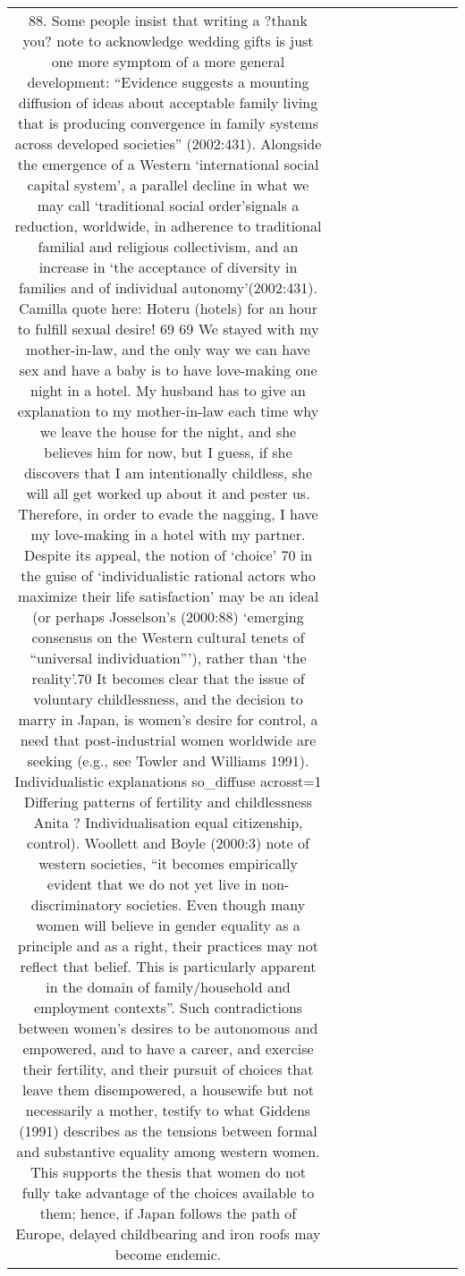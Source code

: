 \begin{table}[h!]
\begin{tabular}{|c|c|c|c|c|c|c|c|c|c|}
88. Some people insist that writing a ?thank you? note to acknowledge wedding gifts is just one more symptom of a more general development: “Evidence suggests a mounting diffusion of ideas about acceptable family living that is producing convergence in family systems across developed societies” (2002:431). Alongside the emergence of a Western ‘international social capital system’, a parallel decline in what we may call ‘traditional social order’signals a reduction, worldwide, in adherence to traditional familial and religious collectivism, and an increase in ‘the acceptance of diversity in families and of individual autonomy’(2002:431).
Camilla quote here:
Hoteru (hotels) for an hour to fulfill sexual desire! 69 69 We stayed with my mother-in-law, and the only way we can have sex and have a baby is to have love-making one night in a hotel. My husband has to give an explanation to my mother-in-law each time why we leave the house for the night, and she believes him for now, but I guess, if she discovers that I am intentionally childless, she will all get worked up about it and pester us.
Therefore, in order to evade the nagging, I have my love-making in a hotel with my partner.
Despite its appeal, the notion of ‘choice’ 70 in the guise of ‘individualistic rational actors who maximize their life satisfaction’ may be an ideal (or perhaps Josselson’s (2000:88) ‘emerging consensus on the Western cultural tenets of “universal individuation”’), rather than ‘the reality’.70 It becomes clear that the issue of voluntary childlessness, and the decision to marry in Japan, is women’s desire for control, a need that post-industrial women worldwide are seeking (e.g., see Towler and Williams 1991).
Individualistic explanations
so_diffuse acrosst=1 Differing patterns of fertility and childlessness Anita ?
Individualisation
equal citizenship, control). Woollett and Boyle (2000:3) note of western societies, “it becomes empirically evident that we do not yet live in non-discriminatory societies. Even though many women will believe in gender equality as a principle and as a right, their practices may not reflect that belief. This is particularly apparent in the domain of family/household and employment contexts”. Such contradictions between women’s desires to be autonomous and empowered, and to have a career, and exercise their fertility, and their pursuit of choices that leave them disempowered, a housewife but not necessarily a mother, testify to what Giddens (1991) describes as the tensions between formal and substantive equality among western women. This supports the thesis that women do not fully take advantage of the choices available to them; hence, if Japan follows the path of Europe, delayed childbearing and iron roofs may become endemic.

\end{tabular}
\end{table}
